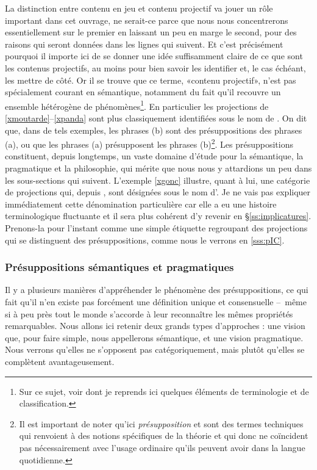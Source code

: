 \begin{refsegment}
La distinction entre contenu en jeu et contenu projectif va jouer un rôle important dans cet ouvrage, ne serait-ce parce que nous nous concentrerons essentiellement sur le premier en laissant un peu en marge le second, pour des raisons qui seront données dans les lignes qui suivent.
Et c'est précisément pourquoi il importe ici de se donner une idée suffisamment claire de ce que sont les contenus projectifs, au moins pour bien savoir les identifier et, le cas échéant, les mettre de côté.  
Or il se trouve que ce terme, «contenu projectif», n'est pas spécialement courant en sémantique, notamment du fait qu'il recouvre un ensemble hétérogène de phénomènes\footnote{Sur ce sujet, voir \citet{TBRS:13} dont je reprends ici quelques éléments de terminologie et de classification.}.
En particulier les projections de \ref{xmoutarde}--\ref{xpanda} sont plus classiquement identifiées sous le nom de  .
On dit que, dans de tels exemples, les phrases (b) sont des présuppositions des phrases (a), ou que les phrases (a) présupposent les phrases (b)\footnote{Il est important de noter qu'ici \emph{présupposition} et  sont des termes techniques qui renvoient à des notions spécifiques de la théorie et qui donc ne coïncident pas nécessairement avec l'usage ordinaire qu'ils peuvent avoir dans la langue quotidienne.}.
Les présuppositions constituent, depuis longtemps, un vaste domaine d'étude pour la sémantique, la pragmatique et la philosophie,  qui mérite que nous nous y attardions un peu dans les sous-sections qui suivent.
L'exemple \ref{xgonc} illustre, quant à lui, une catégorie de projections qui, depuis \citet{Potts:05}, sont désignées sous le nom d'. Je ne vais pas expliquer immédiatement cette dénomination particulière car elle a eu une histoire terminologique fluctuante  et il sera plus cohérent d'y revenir en \S\ref{ss:implicatures}.
Prenons-la pour l'instant comme une simple étiquette  regroupant des projections qui se distinguent des présuppositions, comme nous le verrons en  \ref{sss:pIC}.



\subsubsection{Présuppositions sémantiques et pragmatiques}
\label{sss:pspDf}

Il y a plusieurs manières d'appréhender le phénomène des présuppositions, ce qui fait qu'il n'en existe pas forcément une définition unique et consensuelle --~même si à peu près tout le monde s'accorde à leur reconnaître les mêmes propriétés remarquables.  
Nous allons ici retenir deux grands types d'approches : une vision que, pour faire simple, nous appellerons sémantique, et une vision pragmatique.  Nous verrons qu'elles ne s'opposent pas catégoriquement, mais plutôt qu'elles se complètent avantageusement.



\end{refsegment}
